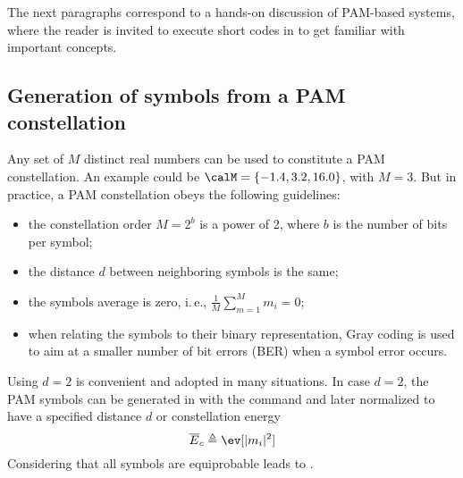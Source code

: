 The next paragraphs correspond to a hands-on discussion of PAM-based systems, where the reader is invited to execute short codes in {\matlab} to get familiar with important concepts.



\subsection{Generation of symbols from a PAM constellation}
\label{sec:pam_constellation}

Any set of $M$ distinct real numbers can be used to constitute a PAM constellation. An example could be $\calM = \{-1.4, 3.2, 16.0\}$, with $M=3$. But in practice, a PAM constellation obeys the following guidelines:
\begin{itemize}
	\item the constellation order $M=2^b$ is a power of 2, where $b$ is the number of bits per symbol;
	\item the distance $d$ between neighboring symbols is the same;
	\item the symbols average is zero, i.\,e., $\frac 1 M \sum_{m=1}^M m_i=0$;
	\item when relating the symbols to their binary representation, Gray coding is used to aim at a smaller number of bit errors (BER) when a symbol error occurs.
\end{itemize}

Using $d=2$ is convenient and adopted in many situations. In case $d=2$, the PAM symbols can be generated in {\matlab} with the command  and later normalized to have a specified distance $d$ or constellation energy 
\begin{equation}
\overline E_c \triangleq \ev [ |m_i|^2 ]
\label{eq:pam_energy_contellation}
\end{equation}
Considering that all symbols are equiprobable leads to .

